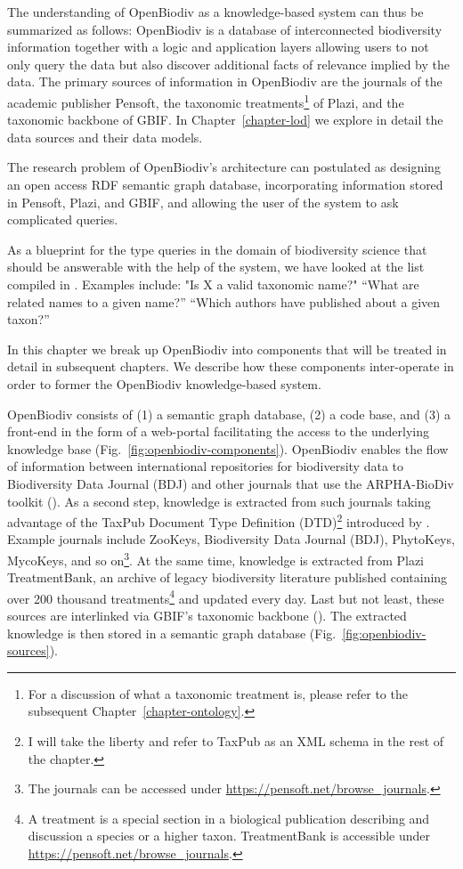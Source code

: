 The understanding of OpenBiodiv as a knowledge-based system can thus be summarized as follows: OpenBiodiv is a  database of interconnected biodiversity information together with a logic and application layers allowing users to not only query the data but also discover additional facts of relevance implied by the data. The primary sources of information in OpenBiodiv are the journals of the academic publisher Pensoft, the taxonomic treatments\footnote{For a discussion of what a taxonomic treatment is, please refer to the subsequent Chapter~\ref{chapter-ontology}.} of Plazi, and the taxonomic backbone of GBIF. In Chapter~\ref{chapter-lod} we explore in detail the data sources and their data models.

The research problem of OpenBiodiv's architecture can postulated as designing an open access RDF semantic graph database, incorporating information stored in Pensoft, Plazi, and GBIF, and allowing the user of the system to ask complicated queries. 

As a blueprint for the type queries in the domain of biodiversity science that should be answerable with the help of the system, we have looked at the list compiled in \cite{pro-ibiosphere_competency_2013}. Examples include: "Is X a valid taxonomic name?" ``What are related names to a given name?'' ``Which authors have published about a given taxon?''

In this chapter we break up OpenBiodiv into components that will be treated in detail in subsequent chapters. We describe how these components inter-operate in order to former the OpenBiodiv knowledge-based system.

OpenBiodiv consists of (1) a semantic graph database, (2) a code base, and (3) a front-end in the form of a web-portal facilitating the access to the underlying knowledge base (Fig.~\ref{fig:openbiodiv-components}). OpenBiodiv enables the flow of information between international repositories for biodiversity data to Biodiversity Data Journal (BDJ) and other journals that use the ARPHA-BioDiv toolkit (\cite{penev_arpha-biodiv:_2017}). As a second step, knowledge is extracted from such journals taking advantage of the TaxPub Document Type Definition (DTD)\footnote{I will take the liberty and refer to TaxPub as an XML schema in the rest of the chapter.} introduced by \cite{catapano_taxpub:_2010}. Example journals include ZooKeys, Biodiversity Data Journal (BDJ), PhytoKeys, MycoKeys, and so on\footnote{The journals can be accessed under \url{https://pensoft.net/browse_journals}.}. At the same time, knowledge is extracted from Plazi TreatmentBank, an archive of legacy biodiversity literature published containing over 200 thousand treatments\footnote{A treatment is a special section in a biological publication describing and discussion a species or a higher taxon. TreatmentBank is accessible under \url{https://pensoft.net/browse_journals}.} and updated every day. Last but not least, these sources are interlinked via GBIF's taxonomic backbone (\cite{gbif_secretariat_gbif_2017}). The extracted knowledge is then stored in a semantic graph database (Fig.~\ref{fig:openbiodiv-sources}).

